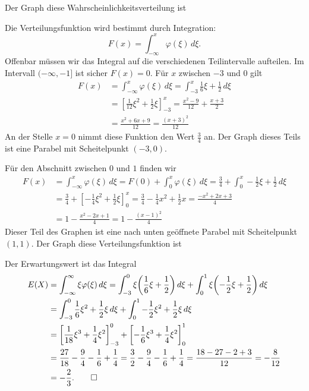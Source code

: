 \begin{loesung}
\begin{teilaufgaben}
\item
Der Graph diese Wahrscheinlichkeitsverteilung ist
\begin{center}
\end{center}
\item Die Verteilungsfunktion wird bestimmt durch Integration:
\[
F(x)=\int_{-\infty}^x\varphi(\xi)\,d\xi.
\]
Offenbar müssen wir das Integral auf die verschiedenen Teilintervalle
aufteilen. Im Intervall $(-\infty,-1]$ ist sicher $F(x)=0$. Für $x$ zwischen
$-3$ und $0$ gilt
\begin{align*}
F(x)&=\int_{-\infty}^x\varphi(\xi)\,d\xi =\int_{-3}^x\frac16\xi+\frac12\,d\xi
\\
&=
\left[\frac1{12}\xi^2+\frac12\xi\right]_{-3}^x=\frac{x^2-9}{12}+\frac{x+3}2
\\
&
=\frac{x^2+6x+9}{12}=\frac{(x+3)^2}{12}
\end{align*}
An der Stelle $x=0$ nimmt diese Funktion den Wert $\frac34$ an.
Der Graph dieses Teils ist eine Parabel mit Scheitelpunkt $(-3,0)$.

Für den Abschnitt zwischen $0$ und $1$ finden wir
\begin{align*}
F(x)
&=
\int_{-\infty}^x\varphi(\xi)\,d\xi
=F(0)+\int_0^x\varphi(\xi)\,d\xi
=\frac34+\int_0^x-\frac12\xi+\frac12\,d\xi\\
&=\frac34+\left[-\frac14\xi^2+\frac12\xi\right]_0^x
=\frac34-\frac14x^2+\frac12x
=\frac{-x^2+2x+3}4\\
&=1-\frac{x^2-2x+1}{4}
=1-\frac{(x-1)^2}4
\end{align*}
Dieser Teil des Graphen ist eine nach unten geöffnete Parabel mit
Scheitelpunkt $(1,1)$.
Der Graph diese Verteilungsfunktion ist
\begin{center}
\end{center}
\item
Der Erwartungswert ist das Integral
\begin{align*}
E(X)&=\int_{-\infty}^\infty\xi\varphi(\xi)\,d\xi
=
\int_{-3}^0\xi\biggl(\frac16\xi+\frac12\biggr)\,d\xi
+\int_0^1\xi\biggl(-\frac12\xi+\frac12\biggr)\,d\xi
\\
&=
\int_{-3}^0\frac16\xi^2+\frac12\xi\,d\xi
+\int_0^1-\frac12\xi^2+\frac12\xi\,d\xi
\\
&=\left[\frac1{18}\xi^3+\frac14\xi^2\right]_{-3}^0
+\left[-\frac16\xi^3+\frac14\xi^2\right]_0^1\\
&=\frac{27}{18}-\frac94-\frac16+\frac14
=\frac{3}{2}-\frac94-\frac16+\frac14
=\frac{18-27-2+3}{12}
=-\frac{8}{12}
\\
&=-\frac23.
\qedhere
\end{align*}
\end{teilaufgaben}
\end{loesung}
